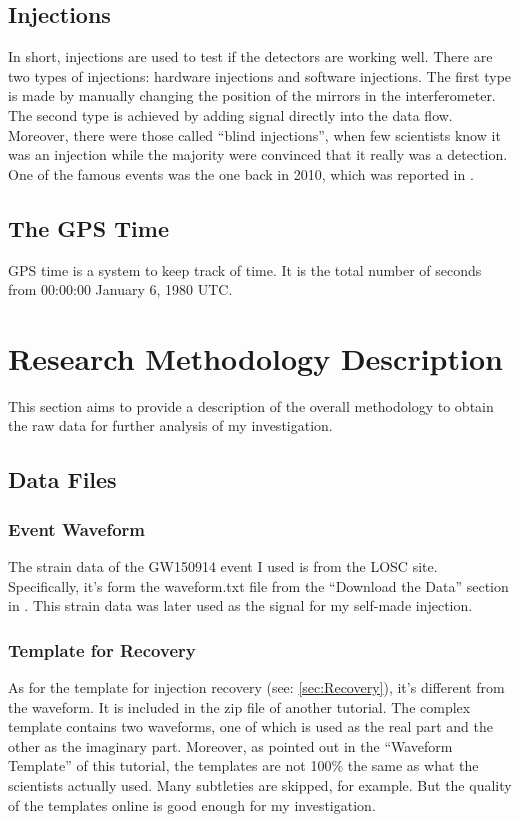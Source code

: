 \documentclass[aps,prd,preprint]{revtex4}
\begin{document}
\subsection{Injections}
In short, injections are used to test if the detectors are working well. There are two types of injections: hardware injections and software injections. The first type is made by manually changing the position of the mirrors in the interferometer. The second type is achieved by adding signal directly into the data flow. Moreover, there were those called \enquote{blind injections}, when few scientists know it was an injection while the majority were convinced that it really was a detection. One of the famous events was the one back in 2010, which was reported in \cite{blindInj}.

\subsection{The GPS Time}
GPS time is a system to keep track of time. It is the total number of seconds from 00:00:00 January 6, 1980 UTC.


\section{Research Methodology Description}
This section aims to provide a description of the overall methodology to obtain the raw data for further analysis of my investigation.

\subsection{Data Files}
\subsubsection{Event Waveform}
The strain data of the GW150914 event I used is from the LOSC site. Specifically, it's form the waveform.txt file from the \enquote{Download the Data} section in \cite{GWTutorial}. This strain data was later used as the signal for my self-made injection.
\subsubsection{Template for Recovery}
As for the template for injection recovery (see: \ref{sec:Recovery}), it's different from the waveform. It is included in the zip file of another tutorial. \cite{GWTutorial2} The complex template contains two waveforms, one of which is used as the real part and the other as the imaginary part. Moreover, as pointed out in the \enquote{Waveform Template} of this tutorial, the templates are not 100\% the same as what the scientists actually used. Many subtleties are skipped, for example. But the quality of the templates online is good enough for my investigation.
\end{document}

